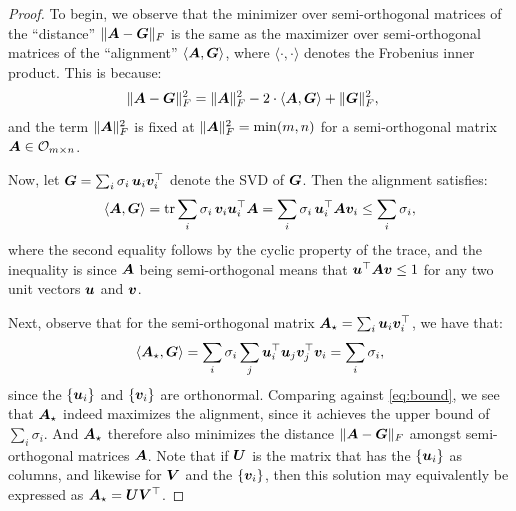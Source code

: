 \begin{proof}
To begin, we observe that the minimizer over semi-orthogonal matrices of the ``distance'' $\Vert {{\bm{A}}- {\bm{G}}} \Vert_F$ is the same as the maximizer over semi-orthogonal matrices of the ``alignment'' $\langle {\bm{A}}, {\bm{G}}\rangle$, where $\langle\cdot,\cdot\rangle$ denotes the Frobenius inner product. This is because:
\begin{align}
    \Vert {{\bm{A}}- {\bm{G}}} \Vert_F^2 &= \Vert {{\bm{A}}} \Vert_F^2 - 2 \cdot \langle {\bm{A}}, {\bm{G}} \rangle + \Vert {{\bm{G}}} \Vert_F^2,
\end{align}
and the term $\Vert {{\bm{A}}} \Vert_F^2$ is fixed at $\Vert {{\bm{A}}} \Vert_F^2 = \min(m,n)$ for a semi-orthogonal matrix ${\bm{A}} \in \mathcal{O}_{m\times n}$.

Now, let ${\bm{G}} = \sum_i \sigma_i \, {\bm{u}}_i{\bm{v}}_i^\top$ denote the SVD of ${\bm{G}}$. Then the alignment satisfies:
\begin{align}\label{eq:bound}
    \langle {\bm{A}}, {\bm{G}} \rangle = \operatorname{tr} \sum_i \sigma_i \,{\bm{v}}_i{\bm{u}}_i^\top {\bm{A}} = \sum_i \sigma_i \, {\bm{u}}_i^\top {\bm{A}} {\bm{v}}_i \leq \sum_i \sigma_i,
\end{align}
where the second equality follows by the cyclic property of the trace, and the inequality is since ${\bm{A}}$ being semi-orthogonal means that ${\bm{u}}^\top {\bm{A}} {\bm{v}} \leq 1$ for any two unit vectors ${\bm{u}}$ and ${\bm{v}}$.

Next, observe that for the semi-orthogonal matrix ${\bm{A}}_\star = \sum_i {\bm{u}}_i {\bm{v}}_i^\top$, we have that:
\begin{equation}
    \langle {\bm{A}}_\star, {\bm{G}} \rangle = \sum_i \sigma_i \sum_j {\bm{u}}_i^\top {\bm{u}}_j {\bm{v}}_j^\top {\bm{v}}_i = \sum_i \sigma_i,
\end{equation}
since the $\{{\bm{u}}_i\}$ and $\{{\bm{v}}_i\}$ are orthonormal. Comparing against \cref{eq:bound}, we see that ${\bm{A}}_\star$ indeed maximizes the alignment, since it achieves the upper bound of $\sum_i \sigma_i$. And ${\bm{A}}_\star$ therefore also minimizes the distance $\Vert {{\bm{A}}- {\bm{G}}} \Vert_F$ amongst semi-orthogonal matrices ${\bm{A}}$. Note that if ${\bm{U}}$ is the matrix that has the $\{{\bm{u}}_i\}$ as columns, and likewise for ${\bm{V}}$ and the $\{{\bm{v}}_i\}$, then this solution may equivalently be expressed as ${\bm{A}}_\star = {\bm{U}}{\bm{V}}^\top$.


\end{proof}
